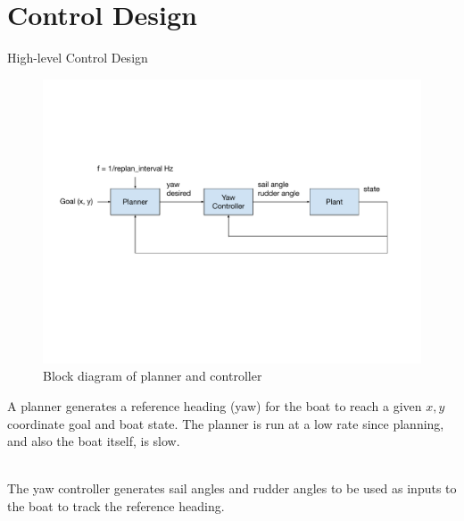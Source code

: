 \documentclass[10pt,xcolor={table,dvipsnames},t]{beamer}
\begin{document}


\section{Control Design}

\begin{frame}{High-level Control Design}

\begin{figure}
    \centering
    \includegraphics[width=\linewidth,trim={1cm 7cm 2cm 5cm},clip]{documents/final_pres_figs/controller_block_diagram.pdf}
    \caption{Block diagram of planner and controller}
    \label{fig:controller_block_diagram}
\end{figure}
    
A planner generates a reference heading (yaw) for the boat to reach a given \(x, y\) coordinate goal
and boat state.
The planner is run at a low rate since planning, and also the boat itself, is slow.

\hfill\\
The yaw controller generates sail angles and rudder angles to be used as inputs to the boat to
track the reference heading.

\end{frame}
\end{document}
